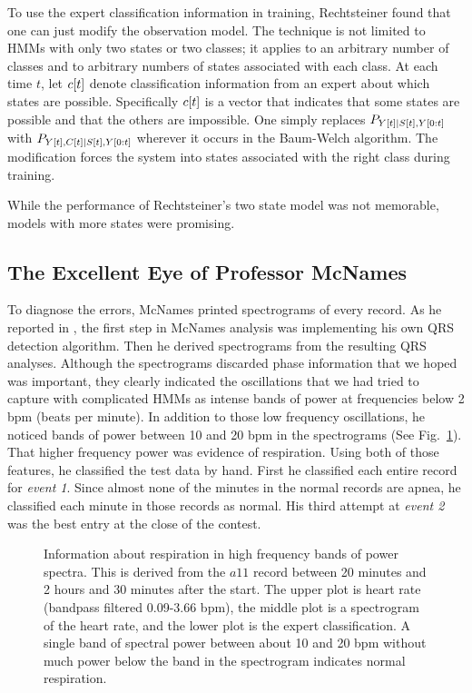 To use the expert classification information in training, Rechtsteiner
found that one can just modify the observation model.  The technique
is not limited to HMMs with only two states or two classes; it applies
to an arbitrary number of classes and to arbitrary numbers of states
associated with each class.  At each time $t$, let ${c}{[t]}$ denote
classification information from an expert about which states are
possible.  Specifically ${c}{[t]}$ is a vector that indicates that
some states are possible and that the others are impossible.  One
simply replaces $P_{{Y}{[t]}\mid {S}{[t]},Y[0:t]}$ with
$P_{{Y}{[t]},{C}{[t]}\mid {S}{[t]},Y[0:t]}$ wherever it occurs
in the Baum-Welch algorithm.  The modification forces the system into
states associated with the right class during training.

While the performance of Rechtsteiner's two state model was not
memorable, models with more states were promising.

\subsection{The Excellent Eye of Professor McNames}
\label{sec:mcnames}

To diagnose the errors, McNames printed spectrograms of every record.
As he reported in \cite{Mcnames2000ObstructiveSA}, the first step in
McNames analysis was implementing his own QRS detection algorithm.
Then he derived spectrograms from the resulting QRS analyses.
Although the spectrograms discarded phase information that we hoped
was important, they clearly indicated the oscillations that we had
tried to capture with complicated HMMs as intense bands of power at
frequencies below 2 bpm (beats per minute).
  In addition to those low
frequency oscillations, he noticed bands of power between 10 and 20
bpm in the spectrograms (See Fig.~\ref{fig:sgram}).  That higher
frequency power was evidence of respiration.  Using both of those
features, he classified the test data by hand.  First he classified
each entire record for \emph{event 1}.  Since almost none of the
minutes in the normal records are apnea, he classified each minute in
those records as normal.  His third attempt at \emph{event 2} was the
best entry at the close of the contest.

\begin{figure}
  \caption[Information about respiration in high
  frequency phase variations]
  {Information about respiration in high frequency bands of power
    spectra.  This is derived from the $a11$ record between 20 minutes
    and 2 hours and 30 minutes after the start.  The upper plot is
    heart rate (bandpass filtered 0.09-3.66 bpm), the middle plot is a
    spectrogram of the heart rate, and the lower plot is the expert
    classification.  A single band of spectral power between about 10
    and 20 bpm without much power below the band in the spectrogram
    indicates normal respiration.}
  \label{fig:sgram}
\end{figure}

